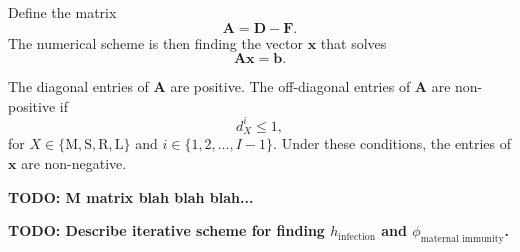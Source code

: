 \documentclass[12pt]{article}
\renewcommand{\vec}[1]{\mathbf{#1}}
\newcommand{\mat}[1]{\mathbf{#1}}
\begin{document}
Define the matrix
\begin{equation}
  \mat{A} =
  \mat{D} - \mat{F}.
\end{equation}
The numerical scheme is then finding the vector $\vec{x}$ that solves
\begin{equation}
  \mat{A} \vec{x} = \vec{b}.
\end{equation}

The diagonal entries of $\mat{A}$ are positive.
The off-diagonal entries of $\mat{A}$ are non-positive if
\begin{equation}
  d_X^i \leq 1,
\end{equation}
for $X \in \{\mathrm{M}, \mathrm{S}, \mathrm{R}, \mathrm{L}\}$ and
$i \in \{1, 2, \ldots, I - 1\}$.
Under these conditions, the entries of $\vec{x}$ are non-negative.

\textbf{TODO: M matrix blah blah blah...}

\textbf{TODO: Describe iterative scheme for finding
  $h_{\text{infection}}$ and $\phi_{\text{maternal immunity}}$.}




\end{document}
